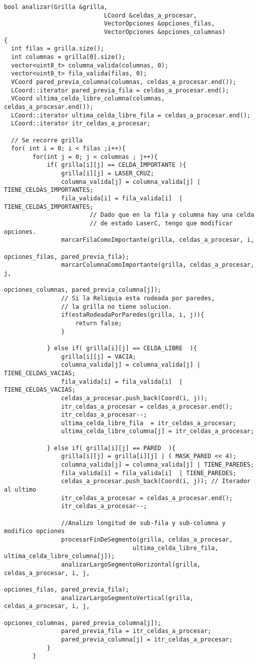 \documentclass[11pt, a4paper, twoside]{article}
\begin{document}
\begin{lstlisting}
bool analizar(Grilla &grilla,
							LCoord &celdas_a_procesar,
							VectorOpciones &opciones_filas,
							VectorOpciones &opciones_columnas)
{
  int filas = grilla.size();
  int columnas = grilla[0].size(); 
  vector<uint8_t> columna_valida(columnas, 0); 
  vector<uint8_t> fila_valida(filas, 0); 
  VCoord pared_previa_columna(columnas, celdas_a_procesar.end());
  LCoord::iterator pared_previa_fila = celdas_a_procesar.end();
  VCoord ultima_celda_libre_columna(columnas, celdas_a_procesar.end()); 
  LCoord::iterator ultima_celda_libre_fila = celdas_a_procesar.end();
  LCoord::iterator itr_celdas_a_procesar;
  
  // Se recorre grilla
  for( int i = 0; i < filas ;i++){
		for(int j = 0; j < columnas ; j++){
			if( grilla[i][j] == CELDA_IMPORTANTE ){
				grilla[i][j] = LASER_CRUZ;
				columna_valida[j] = columna_valida[j] | TIENE_CELDAS_IMPORTANTES;
				fila_valida[i] = fila_valida[i]  | TIENE_CELDAS_IMPORTANTES;
						// Dado que en la fila y columna hay una celda
						// de estado LaserC, tengo que modificar opciones.
				marcarFilaComoImportante(grilla, celdas_a_procesar, i,
																			 opciones_filas, pared_previa_fila);
				marcarColumnaComoImportante(grilla, celdas_a_procesar, j,
															opciones_columnas, pared_previa_columna[j]);
				// Si la Reliquia esta rodeada por paredes,
				// la grilla no tiene solucion. 
				if(estaRodeadaPorParedes(grilla, i, j)){
					return false;
				}
			
			} else if( grilla[i][j] == CELDA_LIBRE  ){
				grilla[i][j] = VACIA;
				columna_valida[j] = columna_valida[j] | TIENE_CELDAS_VACIAS;
				fila_valida[i] = fila_valida[i]  | TIENE_CELDAS_VACIAS;
				celdas_a_procesar.push_back(Coord(i, j));
				itr_celdas_a_procesar = celdas_a_procesar.end();
				itr_celdas_a_procesar--;
				ultima_celda_libre_fila  = itr_celdas_a_procesar;
				ultima_celda_libre_columna[j] = itr_celdas_a_procesar;
			
			} else if( grilla[i][j] == PARED  ){
				grilla[i][j] = grilla[i][j] | ( MASK_PARED << 4);
				columna_valida[j] = columna_valida[j] | TIENE_PAREDES;
				fila_valida[i] = fila_valida[i]  | TIENE_PAREDES;
				celdas_a_procesar.push_back(Coord(i, j)); // Iterador al ultimo
				itr_celdas_a_procesar = celdas_a_procesar.end();
				itr_celdas_a_procesar--;
				
				//Analizo longitud de sub-fila y sub-columna y modifico opciones 
				procesarFinDeSegmento(grilla, celdas_a_procesar,
									ultima_celda_libre_fila, ultima_celda_libre_columna[j]);
				analizarLargoSegmentoHorizontal(grilla, celdas_a_procesar, i, j,
																			 opciones_filas, pared_previa_fila);
				analizarLargoSegmentoVertical(grilla, celdas_a_procesar, i, j,
															opciones_columnas, pared_previa_columna[j]); 
				pared_previa_fila = itr_celdas_a_procesar;
				pared_previa_columna[j] = itr_celdas_a_procesar;
			}
		}
		

\end{lstlisting}
\end{document}
